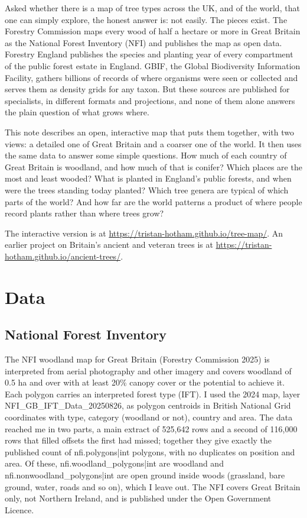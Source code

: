 \documentclass[11pt,a4paper]{article}
\begin{document}
Asked whether there is a map of tree types across the UK, and of the world, that one can simply explore, the honest answer is: not easily. The pieces exist. The Forestry Commission maps every wood of half a hectare or more in Great Britain as the National Forest Inventory (NFI) and publishes the map as open data. Forestry England publishes the species and planting year of every compartment of the public forest estate in England. GBIF, the Global Biodiversity Information Facility, gathers billions of records of where organisms were seen or collected and serves them as density grids for any taxon. But these sources are published for specialists, in different formats and projections, and none of them alone answers the plain question of what grows where.

This note describes an open, interactive map that puts them together, with two views: a detailed one of Great Britain and a coarser one of the world. It then uses the same data to answer some simple questions. How much of each country of Great Britain is woodland, and how much of that is conifer? Which places are the most and least wooded? What is planted in England's public forests, and when were the trees standing today planted? Which tree genera are typical of which parts of the world? And how far are the world patterns a product of where people record plants rather than where trees grow?

The interactive version is at \url{https://tristan-hotham.github.io/tree-map/}. An earlier project on Britain's ancient and veteran trees is at \url{https://tristan-hotham.github.io/ancient-trees/}.

\section{Data}

\subsection{National Forest Inventory}

The NFI woodland map for Great Britain (Forestry Commission 2025) is interpreted from aerial photography and other imagery and covers woodland of 0.5 ha and over with at least 20\% canopy cover or the potential to achieve it. Each polygon carries an interpreted forest type (IFT). I used the 2024 map, layer NFI\_GB\_IFT\_Data\_20250826, as polygon centroids in British National Grid coordinates with type, category (woodland or not), country and area. The data reached me in two parts, a main extract of 525,642 rows and a second of 116,000 rows that filled offsets the first had missed; together they give exactly the published count of {{nfi.polygons|int}} polygons, with no duplicates on position and area. Of these, {{nfi.woodland_polygons|int}} are woodland and {{nfi.nonwoodland_polygons|int}} are open ground inside woods (grassland, bare ground, water, roads and so on), which I leave out. The NFI covers Great Britain only, not Northern Ireland, and is published under the Open Government Licence.
\end{document}

